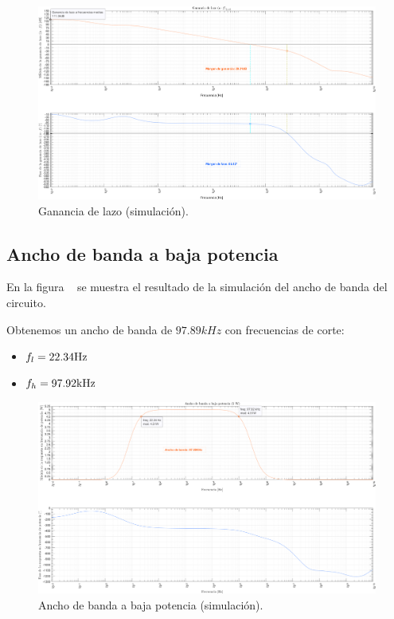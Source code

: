 \begin{figure}[H]
    \centering
    \includegraphics[height=0.66 \textwidth, angle=90]{./img/simulaciones/Loop/gain_loop.png}
    \caption{Ganancia de lazo (simulación).}
    \label{fig:gain_loop_sim}
\end{figure}

\clearpage

\subsection{Ancho de banda a baja potencia}

\par En la figura ~ se muestra el resultado de la simulación del ancho de banda del circuito.
\par Obtenemos un ancho de banda de $97.89kHz$ con frecuencias de corte:

\begin{itemize}
    \item $f_l =22.34 \si[per-mode=symbol]{\hertz}$
    \item $f_h =97.92 \si[per-mode=symbol]{\kilo\hertz}$
\end{itemize}

\vfill

\clearpage

\begin{figure}[H]
    \centering
    \includegraphics[height=0.66 \textwidth, angle=90]{./img/simulaciones/BW/Low_power_BW.png}    \caption{Ancho de banda a baja potencia (simulación).}
    \label{fig:Low_power_BW}
\end{figure}


